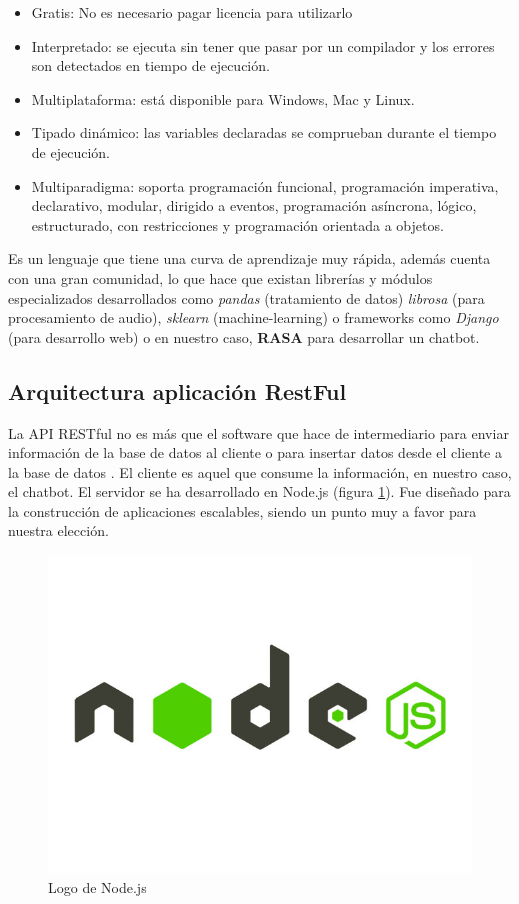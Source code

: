 \begin{itemize}
    \item Gratis: No es necesario pagar licencia para utilizarlo
    \item Interpretado: se ejecuta sin tener que pasar por un compilador y los errores son detectados en tiempo de ejecución.
    \item Multiplataforma: está disponible para Windows, Mac y Linux. 
    \item Tipado dinámico: las variables declaradas se comprueban durante el tiempo de ejecución.
    \item Multiparadigma: soporta programación funcional, programación imperativa, declarativo, modular, dirigido a eventos, programación asíncrona, lógico, estructurado, con restricciones y programación orientada a objetos.
\end{itemize}

Es un lenguaje que tiene una curva de aprendizaje muy rápida, además cuenta con una gran comunidad, lo que hace que existan librerías y módulos especializados desarrollados como \textit{pandas} (tratamiento de datos) \textit{librosa} (para procesamiento de audio), \textit{sklearn} (machine-learning) o frameworks como \textit{Django} (para desarrollo web) o en nuestro caso, \textbf{RASA} para desarrollar un chatbot. 

\subsection{Arquitectura aplicación RestFul}

La API RESTful no es más que el software que hace de intermediario para enviar información de la base de datos al cliente o para insertar datos desde el cliente a la base de datos \cite{apiRest}. El cliente es aquel que consume la información, en nuestro caso, el chatbot. El servidor se ha desarrollado en Node.js (figura \ref{fig:node}). Fue diseñado para la construcción de aplicaciones escalables, siendo un punto muy a favor para nuestra elección. 

\begin{figure}[H]
    \centering
    \includegraphics[scale=0.15]{include/figuras/node.jpg}
    \caption{Logo de Node.js}
    \label{fig:node}
\end{figure}

